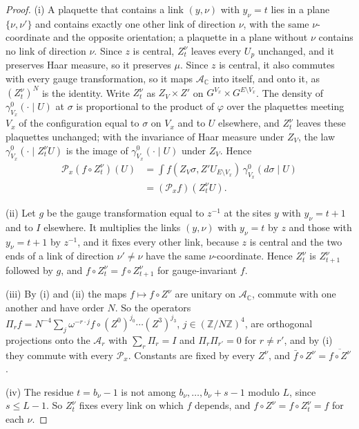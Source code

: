 \documentclass[aps,prd,twocolumn,superscriptaddress,nofootinbib,longbibliography,floatfix,amsmath,amssymb,10pt]{revtex4-2}
\theoremstyle{definition}
\theoremstyle{remark}
\newcommand{\Z}{\mathbb{Z}}
\newcommand{\C}{\mathbb{C}}
\begin{document}
\begin{proof}
(i) A plaquette that contains a link $(y,\nu)$ with $y_\nu=t$ lies in a plane
$\{\nu,\nu'\}$ and contains exactly one other link of direction $\nu$, with
the same $\nu$-coordinate and the opposite orientation; a plaquette in a
plane without $\nu$ contains no link of direction $\nu$. Since $z$ is
central, $Z^\nu_t$ leaves every $U_p$ unchanged, and it preserves Haar
measure, so it preserves $\mu$. Since $z$ is central, it also commutes with
every gauge transformation, so it maps $\mathcal A_\C$ into itself, and onto
it, as $(Z^\nu_t)^N$ is the identity. Write $Z^\nu_t$ as $Z_V\times Z'$ on
$G^{V_x}\times G^{E\setminus V_x}$. The density of $\gamma^0_{V_x}(\cdot\mid
U)$ at $\sigma$ is proportional to the product of $\varphi$ over the
plaquettes meeting $V_x$ of the configuration equal to $\sigma$ on $V_x$
and to $U$ elsewhere, and $Z^\nu_t$ leaves these plaquettes unchanged; with
the invariance of Haar measure under $Z_V$, the law $\gamma^0_{V_x}(\cdot
\mid Z^\nu_tU)$ is the image of $\gamma^0_{V_x}(\cdot\mid U)$ under $Z_V$.
Hence
\[
\begin{split}
\mathcal P_x(f\circ Z^\nu_t)(U)&=\int f(Z_V\sigma,Z'U_{E\setminus V_x})\,
\gamma^0_{V_x}(d\sigma\mid U)\\
&=(\mathcal P_xf)(Z^\nu_tU).
\end{split}
\]

(ii) Let $g$ be the gauge transformation equal to $z^{-1}$ at the sites $y$
with $y_\nu=t+1$ and to $I$ elsewhere. It multiplies the links $(y,\nu)$
with $y_\nu=t$ by $z$ and those with $y_\nu=t+1$ by $z^{-1}$, and it fixes
every other link, because $z$ is central and the two ends of a link of
direction $\nu'\ne\nu$ have the same $\nu$-coordinate. Hence $Z^\nu_t$ is
$Z^\nu_{t+1}$ followed by $g$, and $f\circ Z^\nu_t=f\circ Z^\nu_{t+1}$ for
gauge-invariant $f$.

(iii) By (i) and (ii) the maps $f\mapsto f\circ Z^\nu$ are unitary on
$\mathcal A_\C$, commute with one another and have order $N$. So the
operators $\Pi_rf=N^{-4}\sum_j\omega^{-r\cdot j}f\circ(Z^0)^{j_0}\cdots
(Z^3)^{j_3}$, $j\in(\Z/N\Z)^4$, are orthogonal projections onto the
$\mathcal A_r$ with $\sum_r\Pi_r=I$ and $\Pi_r\Pi_{r'}=0$ for $r\ne r'$, and
by (i) they commute with every $\mathcal P_x$. Constants are fixed by every
$Z^\nu$, and $\bar f\circ Z^\nu=\overline{f\circ Z^\nu}$.

(iv) The residue $t=b_\nu-1$ is not among $b_\nu,\dots,b_\nu+s-1$ modulo
$L$, since $s\le L-1$. So $Z^\nu_t$ fixes every link on which $f$ depends,
and $f\circ Z^\nu=f\circ Z^\nu_t=f$ for each $\nu$.


\end{proof}
\end{document}
